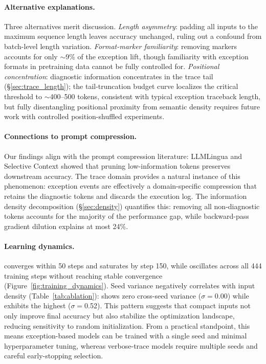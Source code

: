 \paragraph{Alternative explanations.}
Three alternatives merit discussion.
\emph{Length asymmetry}: padding all inputs to the maximum sequence length leaves accuracy unchanged, ruling out a confound from batch-level length variation.
\emph{Format-marker familiarity}: removing markers accounts for only ${\sim}$9\% of the exception lift, though familiarity with exception formats in pretraining data cannot be fully controlled for.
\emph{Positional concentration}: diagnostic information concentrates in the trace tail (\S\ref{sec:trace_length}); the tail-truncation budget curve localizes the critical threshold to ${\sim}$400--500 tokens, consistent with typical exception traceback length, but fully disentangling positional proximity from semantic density requires future work with controlled position-shuffled experiments.

\paragraph{Connections to prompt compression.}
Our findings align with the prompt compression literature: LLMLingua \citep{jiang2023llmlingua} and Selective Context \citep{li2023selectivecontext} showed that pruning low-information tokens preserves downstream accuracy.
The trace domain provides a natural instance of this phenomenon: exception events are effectively a domain-specific compression that retains the diagnostic tokens and discards the execution log.
The information density decomposition (\S\ref{sec:density}) quantifies this: removing all non-diagnostic tokens accounts for the majority of the performance gap, while backward-pass gradient dilution explains at most 24\%.

\paragraph{Learning dynamics.}
 converges within 50 steps and saturates by step 150, while  oscillates across all 444 training steps without reaching stable convergence (Figure~\ref{fig:training_dynamics}).
Seed variance negatively correlates with input density (Table~\ref{tab:ablation}):  shows zero cross-seed variance ($\sigma{=}$0.00) while  exhibits the highest ($\sigma{=}$0.52).
This pattern suggests that compact inputs not only improve final accuracy but also stabilize the optimization landscape, reducing sensitivity to random initialization.
From a practical standpoint, this means exception-based models can be trained with a single seed and minimal hyperparameter tuning, whereas verbose-trace models require multiple seeds and careful early-stopping selection.

